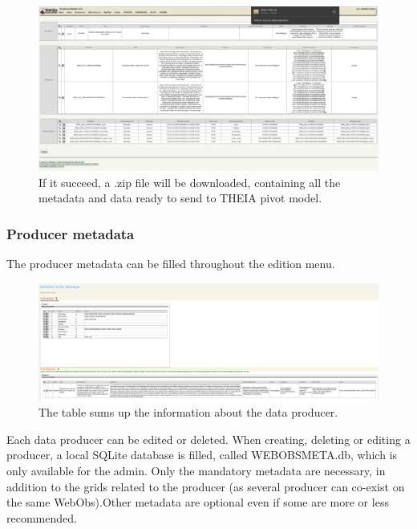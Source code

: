 \newpage

\begin{figure}[!h]
	\centering
	\includegraphics[scale=0.25]{figures/zipfile.png}
	\caption{If it succeed, a .zip file will be downloaded, containing all the metadata and data ready to send to THEIA pivot model.}
\end{figure}

\newpage

\subsubsection{Producer metadata}

The producer metadata can be filled throughout the  edition menu. 

\begin{figure}[!h]
	\centering
	\includegraphics[width=\textwidth]{figures/gridsMgr.png}
	\caption{The table sums up the information about the data producer.}
\end{figure}

Each data producer can be edited or deleted. When creating, deleting or editing a producer, a local SQLite database is filled,  called WEBOBSMETA.db, which is only available for the admin. Only the mandatory metadata are necessary, in addition to the grids related to the producer (as several producer can co-exist on the same WebObs).Other metadata are optional even if some are more or less recommended.

